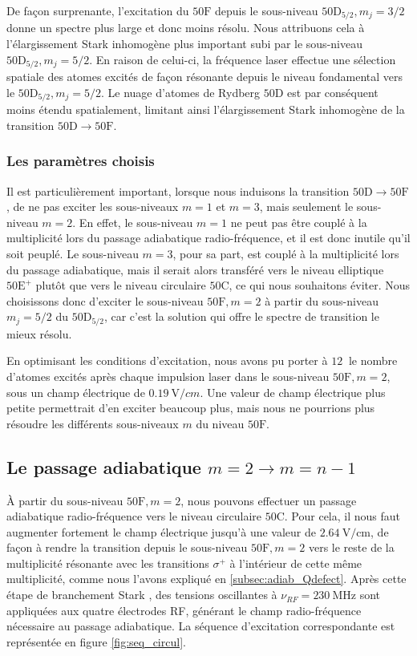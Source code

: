 De façon surprenante, l'excitation du $\mathrm{50F}$ depuis le sous-niveau $\mathrm{50D}_{5/2}, m_j = 3/2$ donne un spectre plus large et donc moins résolu.
Nous attribuons cela à l'élargissement Stark inhomogène plus important subi par le sous-niveau $\mathrm{50D}_{5/2}, m_j = 5/2$.
En raison de celui-ci, la fréquence laser effectue une sélection spatiale des atomes excités de façon résonante depuis le niveau fondamental vers le $\mathrm{50D}_{5/2}, m_j = 5/2$.
Le nuage d'atomes de Rydberg $\mathrm{50D}$ est par conséquent moins étendu spatialement, limitant ainsi l'élargissement Stark inhomogène de la transition $\mathrm{50D}\rightarrow\mathrm{50F}$.

\subsubsection*{Les paramètres choisis}
\noindent Il est particulièrement important, lorsque nous induisons la transition $\mathrm{50D \rightarrow 50F}$, de ne pas exciter les sous-niveaux $m=1$ et $m=3$, mais seulement le sous-niveau $m=2$.
En effet, le sous-niveau $m=1$ ne peut pas être couplé à la multiplicité lors du passage adiabatique radio-fréquence, et il est donc inutile qu'il soit peuplé.
Le sous-niveau $m=3$, pour sa part, est couplé à la multiplicité lors du passage adiabatique, mais il serait alors transféré vers le niveau elliptique $\mathrm{50E^+}$ plutôt que vers le niveau circulaire $\mathrm{50C}$, ce qui nous souhaitons éviter.
Nous choisissons donc d'exciter le sous-niveau $\mathrm{50F},m=2$ à partir du sous-niveau $m_j=5/2$ du $\mathrm{50D}_{5/2}$, car c'est la solution qui offre le spectre de transition le mieux résolu.

En optimisant les conditions d'excitation, nous avons pu porter à $\SI{12}{}$ le nombre d'atomes excités après chaque impulsion laser dans le sous-niveau $\mathrm{50F},m=2$, sous un champ électrique de $\SI{0.19}{\V/cm}$.
Une valeur de champ électrique plus petite permettrait d'en exciter beaucoup plus, mais nous ne pourrions plus résoudre les différents sous-niveaux $m$ du niveau $\mathrm{50F}$.


\clearpage
\subsection{Le passage adiabatique $m=2\rightarrow m=n-1$}
\noindent \`A partir du sous-niveau $\mathrm{50F},m=2$, nous pouvons effectuer un passage adiabatique radio-fréquence vers le niveau circulaire $\mathrm{50C}$.
Pour cela, il nous faut augmenter fortement le champ électrique jusqu'à une valeur de $\SI{2.64}{\V/\cm}$, de façon à rendre la transition depuis le sous-niveau $\mathrm{50F},m=2$ vers le reste de la multiplicité résonante avec les transitions $\sigma^+$ à l'intérieur de cette même multiplicité, comme nous l'avons expliqué en \ref{subsec:adiab_Qdefect}.
Après cette étape de \og branchement Stark \fg{}, des tensions oscillantes à $\nu_{RF} = \SI{230}{\MHz}$ sont appliquées aux quatre électrodes RF, générant le champ radio-fréquence nécessaire au passage adiabatique.
La séquence d'excitation correspondante est représentée en figure \eqref{fig:seq_circul}.

